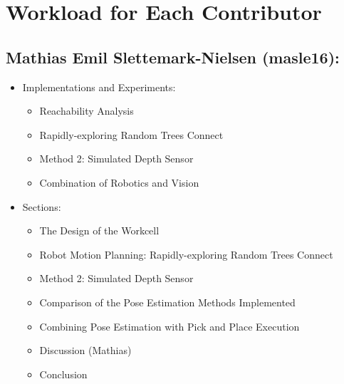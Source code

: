 \documentclass[../main.tex]{subfiles}
\begin{document}
\section*{Workload for Each Contributor} \label{sec:workload}

\subsection*{Mathias Emil Slettemark-Nielsen (masle16):}
\begin{itemize}
    \item Implementations and Experiments:
    \begin{itemize}
        \item Reachability Analysis
        \item Rapidly-exploring Random Trees Connect
        \item Method 2: Simulated Depth Sensor
        \item Combination of Robotics and Vision
    \end{itemize}
    \item Sections:
    \begin{itemize}
        \item The Design of the Workcell
        \item Robot Motion Planning: Rapidly-exploring Random Trees Connect
        \item Method 2: Simulated Depth Sensor
        \item Comparison of the Pose Estimation Methods Implemented
        \item Combining Pose Estimation with Pick and Place Execution
        \item Discussion (Mathias)
        \item Conclusion
    \end{itemize}
\end{itemize}
\end{document}
